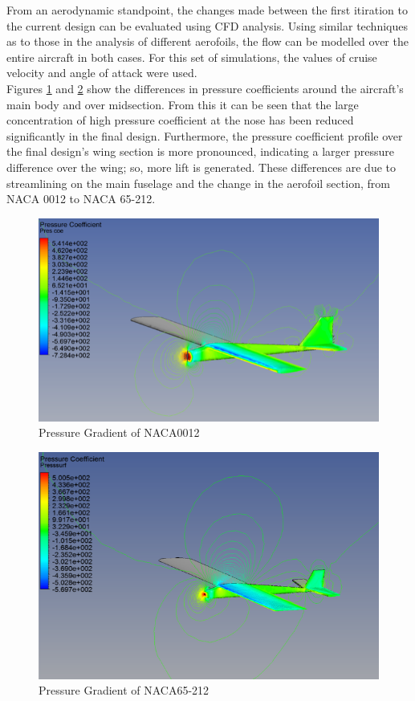 \documentclass[12pt]{article}
\begin{document}
\noindent From an aerodynamic standpoint, the changes made between the first itiration to the current design can be evaluated using CFD analysis. Using similar techniques as to those in the analysis of different aerofoils, the flow can be modelled over the entire aircraft in both cases. For this set of simulations, the values of cruise velocity and angle of attack were used. \\

\noindent Figures \ref{fig:pressbad} and \ref{fig:pressgood} show the differences in pressure coefficients around the aircraft’s main body and over midsection. From this it can be seen that the large concentration of high pressure coefficient at the nose has been reduced significantly in the final design. Furthermore, the pressure coefficient profile over the final design’s wing section is more pronounced, indicating a larger pressure difference over the wing; so, more lift is generated. These differences are due to streamlining on the main fuselage and the change in the aerofoil section, from NACA 0012 to NACA 65-212. \\

\begin{figure}[h!]
    \includegraphics[width=13cm, scale=1]{Pressurecoefficientbad.png}
    \caption{Pressure Gradient of NACA0012}
    \label{fig:pressbad}
\end{figure}

\begin{figure}[h!]
    \includegraphics[width=13cm, scale=1]{pressurecoeffientgood.png}
    \caption{Pressure Gradient of NACA65-212}
    \label{fig:pressgood}
\end{figure}
\end{document}
